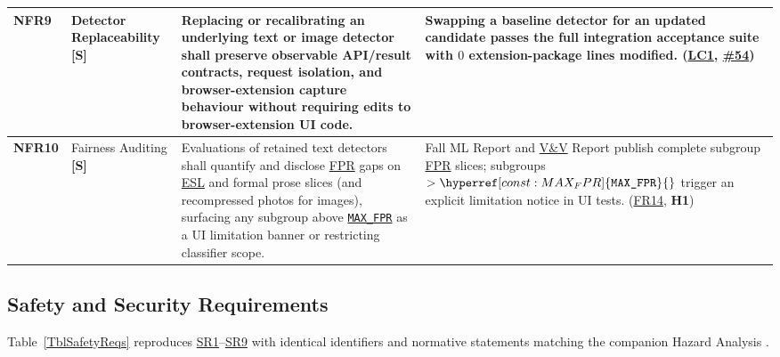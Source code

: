 \documentclass[11pt]{article}
\newcommand{\MaxFPR}{\hyperref[const:MAX_FPR]{\texttt{MAX\_\allowbreak{}FPR}}}
\newcommand{\ESL}{\hyperlink{acr-esl}{ESL}}
\newcommand{\FPR}{\hyperlink{acr-fpr}{FPR}}
\newcommand{\VnV}{\hyperlink{acr-vnv}{V\&V}}
\begin{document}
{\begin{tabularx}{\textwidth}{P{1.1cm} P{2.25cm} Y Q{3.85cm}}
\label{NFR9}\textbf{NFR9} & Detector Replaceability \textbf{[S]} &
Replacing or recalibrating an underlying text or image detector shall preserve observable API/result contracts, request isolation, and browser-extension capture behaviour without requiring edits to browser-extension UI code. &
Swapping a baseline detector for an updated candidate passes the full integration acceptance suite with $0$ extension-package lines modified. (\hyperref[LC1]{LC1}, \href{https://github.com/richy1337/Verity/issues/54}{\#54})\\
\midrule

\label{NFR10}\textbf{NFR10} & Fairness Auditing \textbf{[S]} &
Evaluations of retained text detectors shall quantify and disclose \FPR{} gaps on \ESL{} and formal prose slices (and recompressed photos for images), surfacing any subgroup above \MaxFPR{} as a UI limitation banner or restricting classifier scope. &
Fall ML Report and \VnV{} Report publish complete subgroup \FPR{} slices; subgroups $> \MaxFPR{}$ trigger an explicit limitation notice in UI tests. (\hyperref[FR14]{FR14}, \textbf{H1})\\
\end{tabularx}
}

\subsection{Safety and Security Requirements}\label{subsec:safety-reqs}

Table~\ref{TblSafetyReqs} reproduces \hyperref[SR1]{SR1}--\hyperref[SR9]{SR9} with identical identifiers and normative statements matching the companion Hazard Analysis \cite{VerityHA2026}.
\end{document}
